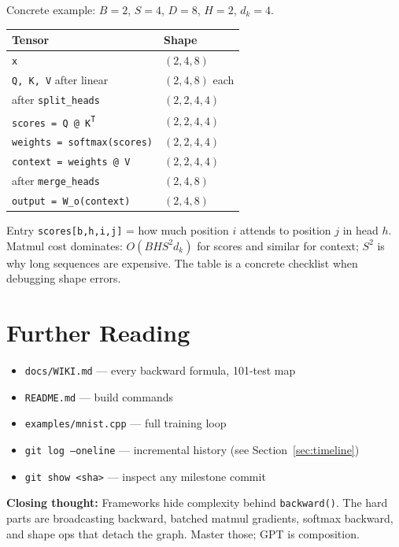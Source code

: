 \documentclass[11pt,a4paper]{article}
\begin{document}
Concrete example: $B{=}2$, $S{=}4$, $D{=}8$, $H{=}2$, $d_k{=}4$.

\begin{center}
\small
\begin{tabular}{@{}ll@{}}
  \toprule
  Tensor & Shape \\
  \midrule
  \texttt{x} & $(2, 4, 8)$ \\
  \texttt{Q, K, V} after linear & $(2, 4, 8)$ each \\
  after \texttt{split\_heads} & $(2, 2, 4, 4)$ \\
  \texttt{scores = Q @ K\textsuperscript{T}} & $(2, 2, 4, 4)$ \\
  \texttt{weights = softmax(scores)} & $(2, 2, 4, 4)$ \\
  \texttt{context = weights @ V} & $(2, 2, 4, 4)$ \\
  after \texttt{merge\_heads} & $(2, 4, 8)$ \\
  \texttt{output = W\_o(context)} & $(2, 4, 8)$ \\
  \bottomrule
\end{tabular}
\end{center}

Entry \texttt{scores[b,h,i,j]} = how much position $i$ attends to position $j$ in head $h$.
Matmul cost dominates: $O(B H S^2 d_k)$ for scores and similar for context; $S^2$ is why long
sequences are expensive. The table is a concrete checklist when debugging shape errors.

\section{Further Reading}

\begin{itemize}[leftmargin=*]
  \item \texttt{docs/WIKI.md} --- every backward formula, 101-test map
  \item \texttt{README.md} --- build commands
  \item \texttt{examples/mnist.cpp} --- full training loop
  \item \texttt{git log --oneline} --- incremental history (see Section~\ref{sec:timeline})
  \item \texttt{git show <sha>} --- inspect any milestone commit
\end{itemize}

\vspace{1em}
\noindent
\textbf{Closing thought:} Frameworks hide complexity behind \texttt{backward()}. The hard
parts are broadcasting backward, batched matmul gradients, softmax backward, and shape ops
that detach the graph. Master those; GPT is composition.
\end{document}
